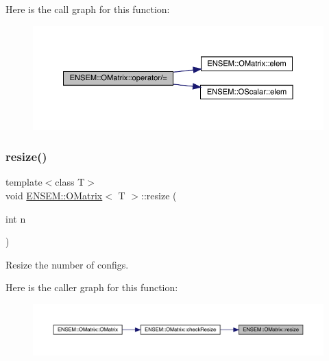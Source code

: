 Here is the call graph for this function\+:
\nopagebreak
\begin{figure}[H]
\begin{center}
\leavevmode
\includegraphics[width=350pt]{dd/d80/classENSEM_1_1OMatrix_a46dc90e0e33442dcdcb9e98f9cf0025e_cgraph}
\end{center}
\end{figure}
\mbox{\label{classENSEM_1_1OMatrix_abb999e63b84b6d958e43443dc04e46be}} 
\subsubsection{\texorpdfstring{resize()}{resize()}\hspace{0.1cm}{\footnotesize\ttfamily [1/3]}}
{\footnotesize\ttfamily template$<$class T$>$ \\
void \mbox{\hyperlink{classENSEM_1_1OMatrix}{E\+N\+S\+E\+M\+::\+O\+Matrix}}$<$ T $>$\+::resize (\begin{DoxyParamCaption}\item[{int}]{n }\end{DoxyParamCaption})\hspace{0.3cm}{\ttfamily [inline]}}



Resize the number of configs. 

Here is the caller graph for this function\+:
\nopagebreak
\begin{figure}[H]
\begin{center}
\leavevmode
\includegraphics[width=350pt]{dd/d80/classENSEM_1_1OMatrix_abb999e63b84b6d958e43443dc04e46be_icgraph}
\end{center}
\end{figure}
\mbox{\label{classENSEM_1_1OMatrix_abb999e63b84b6d958e43443dc04e46be}} 
